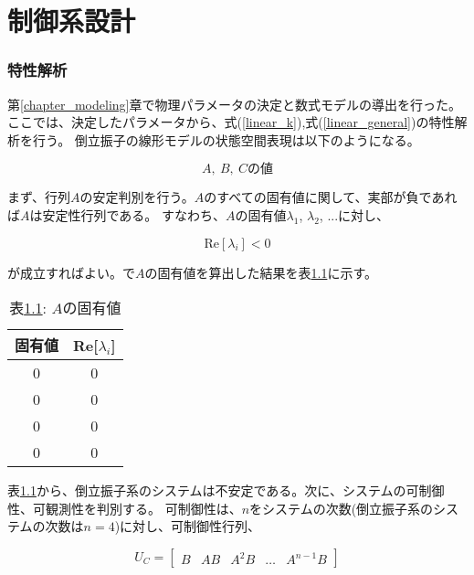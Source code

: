 \chapter{制御系設計}
\subsection{特性解析}
第\ref{chapter_modeling}章で物理パラメータの決定と数式モデルの導出を行った。
ここでは、決定したパラメータから、式(\ref{linear_k}),式(\ref{linear_general})の特性解析を行う。
倒立振子の線形モデルの状態空間表現は以下のようになる。

\begin{equation}
    A,\ B,\ Cの値
    \label{ABC}
\end{equation}

まず、行列$A$の安定判別を行う。$A$のすべての固有値に関して、実部が負であれば$A$は安定性行列である。
すなわち、$A$の固有値$\lambda_{1}$, $\lambda_{2}$, $...$に対し、

$$
    \mbox{Re}[\lambda_{i}] < 0
$$

が成立すればよい。\MaTX{}で$A$の固有値を算出した結果を表\ref{eigen_A}に示す。

\begin{table}[htbp]
    \begin{center}
        \caption{表\ref{eigen_A}: $A$の固有値}
        \begin{tabular}{|c|c|} \hline
            固有値 & Re[$\lambda_{i}$] \\ \hline \hline
            0 & 0 \\ \hline
            0 & 0 \\ \hline
            0 & 0 \\ \hline
            0 & 0 \\ \hline
        \end{tabular}
        \label{eigen_A}
    \end{center}
\end{table}

表\ref{eigen_A}から、倒立振子系のシステムは不安定である。次に、システムの可制御性、可観測性を判別する。
可制御性は、$n$をシステムの次数(倒立振子系のシステムの次数は$n = 4$)に対し、可制御性行列、

$$
    U_{C} =
    \left[
        \begin{array}{ccccc}
            B  &  AB  &  A^2B  &  \dots  &  A^{n-1}B
        \end{array}
    \right]
$$

